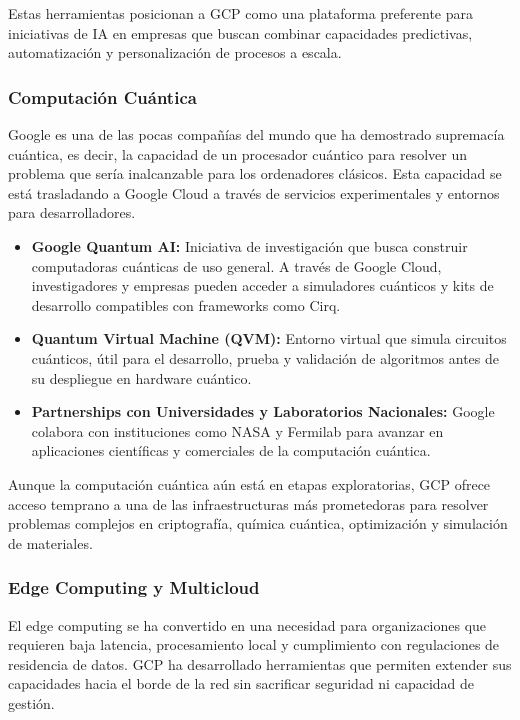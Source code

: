 {                Estas herramientas posicionan a GCP como una plataforma preferente para iniciativas de IA en empresas que buscan combinar capacidades predictivas, automatización y personalización de procesos a escala.
                
            \subsubsection{Computación Cuántica}
                Google es una de las pocas compañías del mundo que ha demostrado supremacía cuántica, es decir, la capacidad de un procesador cuántico para resolver un problema que sería inalcanzable para los ordenadores clásicos. Esta capacidad se está trasladando a Google Cloud a través de servicios experimentales y entornos para desarrolladores.
                
                \begin{itemize}
                    \item \textbf{Google Quantum AI:} Iniciativa de investigación que busca construir computadoras cuánticas de uso general. A través de Google Cloud, investigadores y empresas pueden acceder a simuladores cuánticos y kits de desarrollo compatibles con frameworks como Cirq.
                    \item \textbf{Quantum Virtual Machine (QVM):} Entorno virtual que simula circuitos cuánticos, útil para el desarrollo, prueba y validación de algoritmos antes de su despliegue en hardware cuántico.
                    \item \textbf{Partnerships con Universidades y Laboratorios Nacionales:} Google colabora con instituciones como NASA y Fermilab para avanzar en aplicaciones científicas y comerciales de la computación cuántica.
                \end{itemize}
                
                Aunque la computación cuántica aún está en etapas exploratorias, GCP ofrece acceso temprano a una de las infraestructuras más prometedoras para resolver problemas complejos en criptografía, química cuántica, optimización y simulación de materiales.
                
            \subsubsection{Edge Computing y Multicloud}
                El edge computing se ha convertido en una necesidad para organizaciones que requieren baja latencia, procesamiento local y cumplimiento con regulaciones de residencia de datos. GCP ha desarrollado herramientas que permiten extender sus capacidades hacia el borde de la red sin sacrificar seguridad ni capacidad de gestión.
                
}
